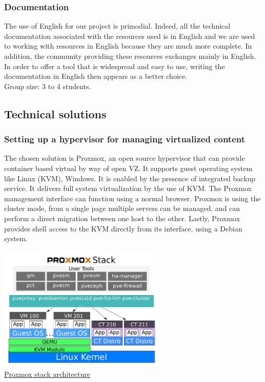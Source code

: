 \vspace{0.5cm}
\subsubsection{Documentation}
The use of English for our project is primodial. Indeed, all the technical
documentation associated with the resources used is in English and we are used
to working with resources in English because they are much more complete. In
addition, the community providing these resources exchanges mainly in English. In order
to offer a tool that is widespread and easy to use, writing the
documentation in English then appears as a better choice. \\
Group size: 3 to 4 students.


\pagebreak

\subsection{Technical solutions}

\vspace{1cm}
\subsubsection{Setting up a hypervisor for managing virtualized content}

The chosen solution is Proxmox, an open source hypervisor that can provide container based virtual by way of open VZ.
It supports guest operating system like Linux (KVM), Windows. It is enabled by the presence of integrated backup service.
It delivers full system virtualization by the use of KVM.
The Proxmox management interface can function using a normal browser.
Proxmox is using the cluster mode, from a single page multiple servers can be managed.
and can perform a direct migration between one host to the other.
Lastly, Proxmox provides shell access to the KVM directly from its interface, using a Debian system. 

\begin{center}

\includegraphics[width=0.6\textwidth]{images/proxmox-stack-example.jpg}
\\
\underline{Proxmox stack architecture}

\end{center}

